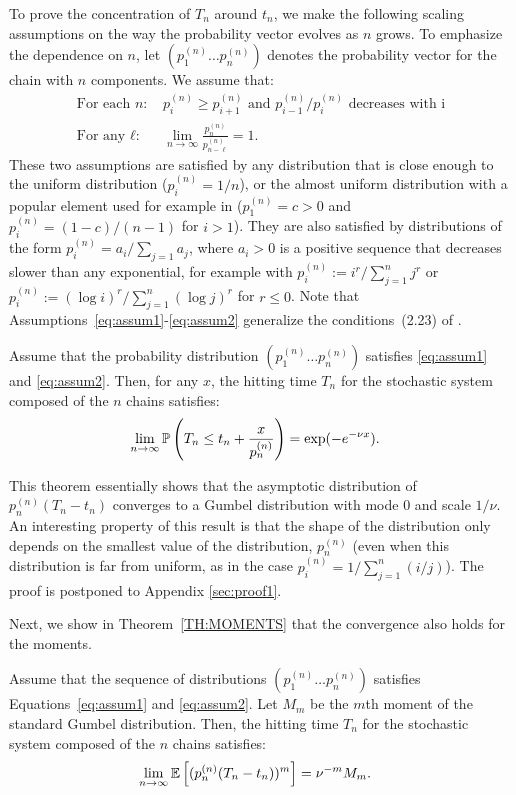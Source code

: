 \documentclass{aptpub}
\newcommand\expect[1]{\mathchoice{\bexpect{#1}}{\sexpect{#1}}{\sexpect{#1}}{\sexpect{#1}}}
\newcommand\bexpect[1]{\mathbb{E}\left[#1\right]}
\newcommand\sexpect[1]{\mathbb{E}[#1]}
\newcommand\proba[1]{\mathchoice{\bproba{#1}}{\sproba{#1}}{\sproba{#1}}{\sproba{#1}}}
\newcommand\bproba[1]{\mathbb{P}\left(#1\right)}
\newcommand\sproba[1]{\mathbb{P}(#1)}
\newcommand{\bydef}{:=}
\begin{document}
To prove the concentration of $T_n$ around $t_n$, we make the
following scaling assumptions on the way the probability vector
evolves as $n$ grows. To emphasize the dependence on $n$, let
$(p^{(n)}_1\dots p^{(n)}_n)$ denotes the probability vector for the
chain with $n$ components. We assume that:
\begin{align}
  \text{For each $n$: } &p^{(n)}_{i}\ge p^{(n)}_{i+1}\text{ and } p^{(n)}_{i-1}/ p^{(n)}_{i} \text{ decreases with i}\label{eq:assum1}\\ 
  \text{For any $\ell$: } &\lim_{n\to\infty} \frac{p^{(n)}_n}{p^{(n)}_{n-\ell}}=1.
                         \label{eq:assum2}
\end{align}
These two assumptions are satisfied by any distribution that is close
enough to the uniform distribution ($p^{(n)}_i=1/n$), or the almost
uniform distribution with a popular element used for example in
\cite{anceaume2015} ($p^{(n)}_1=c>0$ and $p^{(n)}_i=(1-c)/(n-1)$ for
$i>1$). They are also satisfied by distributions of the form
$p^{(n)}_i = a_i/\sum_{j=1} a_j$, where $a_i>0$ is a positive sequence
that decreases slower than any exponential, for example with
$p^{(n)}_i \bydef i^r/\sum_{j=1}^n j^r$ or
$p^{(n)}_i \bydef (\log i)^r/\sum_{j=1}^n (\log j)^r$ for $r\le 0$.
Note that Assumptions~\eqref{eq:assum1}-\eqref{eq:assum2} generalize
the conditions~(2.23) of \cite{doumas2014coupon}.


\begin{thm}
  \label{TH:GUMBEL}
  Assume that the probability distribution
  $(p^{(n)}_1\dots p^{(n)}_n)$ satisfies \eqref{eq:assum1} and
  \eqref{eq:assum2}. Then, for any $x$, the hitting time $T_n$ for the
  stochastic system composed of the $n$ chains satisfies:
  \begin{align}
    &\lim_{n\to\infty}\proba{T_n\le t_n+\frac{x}{p^{(n)}_n}}=\exp(-e^{-\nu x}).\label{eq:th_proba}
  \end{align}
\end{thm}
  

This theorem essentially shows that the asymptotic distribution of
$p_n^{(n)}(T_n-t_n)$ converges to a Gumbel distribution with mode $0$
and scale $1/\nu$. An interesting property of this result is that the
shape of the distribution only depends on the smallest value of the
distribution, $p_n^{(n)}$ (even when this distribution is far from
uniform, as in the case $p_i^{(n)}= 1/\sum_{j=1}^n(i/j)$).  The proof is
postponed to Appendix \ref{sec:proof1}.



Next, we show in Theorem~\ref{TH:MOMENTS} that the convergence also
holds for the moments.  
\begin{thm}\label{TH:MOMENTS}
  Assume that the sequence of distributions
  $(p^{(n)}_1\dots p^{(n)}_n)$ satisfies Equations~\eqref{eq:assum1}
  and \eqref{eq:assum2}. Let $M_m$ be the $m$th moment of the standard
  Gumbel distribution. Then, the hitting time $T_n$ for the stochastic
  system composed of the $n$ chains satisfies:
  \begin{align}
    &\lim_{n\to\infty}\expect{(p_n^{(n)}(T_n- t_n))^m}=\nu^{-m}
      M_m.\label{eq:th_esp}
  \end{align}
\end{thm}
\end{document}
